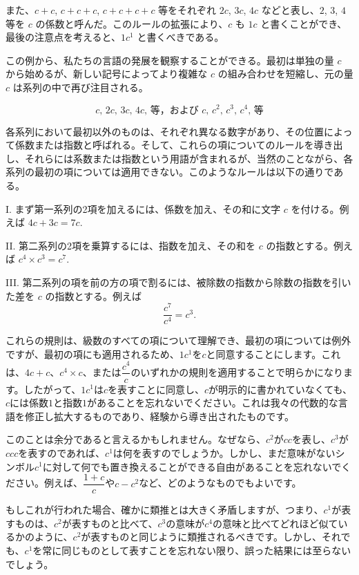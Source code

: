 \documentclass[a4paper,11pt,openany]{ltjsbook}
\begin{document}
また、$c + c$, $c + c + c$, $c + c + c + c$ 等をそれぞれ $2c$, $3c$, $4c$ などと表し、$2$, $3$, $4$ 等を $c$ の係数と呼んだ。このルールの拡張により、$c$ も $1c$ と書くことができ、最後の注意点を考えると、$1c^{1}$ と書くべきである。

この例から、私たちの言語の発展を観察することができる。最初は単独の量 $c$ から始めるが、新しい記号によってより複雑な $c$ の組み合わせを短縮し、元の量 $c$ は系列の中で再び注目される。

\[
\text{$c$, $2c$, $3c$, $4c$, 等，および $c$, $c^{2}$, $c^{3}$, $c^{4}$, 等}
\]

各系列において最初以外のものは、それぞれ異なる数字があり、その位置によって係数または指数と呼ばれる。そして、これらの項についてのルールを導き出し、それらには系数または指数という用語が含まれるが、当然のことながら、各系列の最初の項については適用できない。このようなルールは以下の通りである。

I. まず第一系列の2項を加えるには、係数を加え、その和に文字 \( c \) を付ける。例えば
\( 4c + 3c = 7c \).

II. 第二系列の2項を乗算するには、指数を加え、その和を \( c \) の指数とする。例えば
\( c^{4} × c^{3} = c^{7} \).

III. 第二系列の項を前の方の項で割るには、被除数の指数から除数の指数を引いた差を \( c \) の指数とする。例えば
\[
\frac{c^{7}}{c^{4}} = c^{3}.
\]

これらの規則は、級数のすべての項について理解でき、最初の項については例外ですが、最初の項にも適用されるため、$1c^{1}$を$c$と同意することにします。これは、$4c + c$、$c^{4} \times c$、または$\dfrac{c^{4}}{c}$のいずれかの規則を適用することで明らかになります。したがって、$1c^{1}$は$c$を表すことに同意し、$c$が明示的に書かれていなくても、$c$には係数$1$と指数$1$があることを忘れないでください。これは我々の代数的な言語を修正し拡大するものであり、経験から導き出されたものです。

このことは余分であると言えるかもしれません。なぜなら、$c^{2}$が$cc$を表し、$c^{3}$が$ccc$を表すのであれば、$c^{1}$は何を表すのでしょうか。しかし、まだ意味がないシンボル$c^{1}$に対して何でも置き換えることができる自由があることを忘れないでください。例えば、$\dfrac{1 + c}{c}$や$c - c^{2}$など、どのようなものでもよいです。

もしこれが行われた場合、確かに類推とは大きく矛盾しますが、つまり、$c^{1}$が表すものは、$c^{2}$が表すものと比べて、$c^{3}$の意味が$c^{4}$の意味と比べてどれほど似ているかのように、$c^{2}$が表すものと同じように類推されるべきです。しかし、それでも、$c^{1}$を常に同じものとして表すことを忘れない限り、誤った結果には至らないでしょう。
\end{document}
